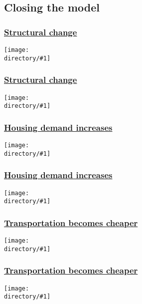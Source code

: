 \documentclass[compress,mathserif]{beamer}
\newcommand{\directory}{figures}
\newcommand{\widefigure}[2]{\begin{frame}\frametitle{\hyperlink{#1back}{#2}}\hypertarget{#1}{{\begin{center}\texttt{[image: \\directory/\#1]}\end{center}}}\end{frame}}
\begin{document}

\subsection{Closing the model}

\widefigure{PPF-location-nonhomothetic-1}{Structural change}
\widefigure{PPF-location-nonhomothetic-2}{Structural change}

\widefigure{PPF-location-housing-1}{Housing demand increases}
\widefigure{PPF-location-housing-2}{Housing demand increases}

\widefigure{PPF-location-transport-1}{Transportation becomes cheaper}
\widefigure{PPF-location-transport-2}{Transportation becomes cheaper}
\end{document}
